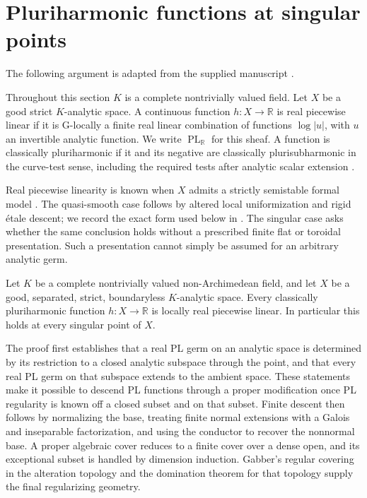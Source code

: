 \section{Pluriharmonic functions at singular points}
\label{sec:supplied-p061}

The following argument is adapted from the supplied manuscript
\cite{SuppliedP06120260924}.
\label{sec:supplied-p061-introduction}

Throughout this section $K$ is a complete nontrivially valued field.
Let $X$ be a good strict $K$-analytic space. A continuous function $h:X\to\mathbb R$ is real piecewise linear if it is G-locally a finite real linear combination of functions $\log|u|$, with $u$ an invertible analytic function. We write $\operatorname{PL}_{\mathbb R}$ for this sheaf. A function is classically pluriharmonic if it and its negative are classically plurisubharmonic in the curve-test sense, including the required tests after analytic scalar extension \cite[Definition~7.1]{GR25Classical}.

Real piecewise linearity is known when $X$ admits a strictly semistable formal model \cite[Proposition~7.8]{GR25Classical}. The quasi-smooth case follows by altered local uniformization and rigid \'{e}tale descent; we record the exact form used below in . The singular case asks whether the same conclusion holds without a prescribed finite flat or toroidal presentation. Such a presentation cannot simply be assumed for an arbitrary analytic germ.

\begin{theorem}\label{thm:supplied-p061-singular-pluriharmonic}
Let $K$ be a complete nontrivially valued non-Archimedean field, and let $X$ be a good, separated, strict, boundaryless $K$-analytic space. Every classically pluriharmonic function $h:X\to\mathbb R$ is locally real piecewise linear. In particular this holds at every singular point of $X$.
\end{theorem}

The proof first establishes that a real PL germ on an analytic space is determined by its restriction to a closed analytic subspace through the point, and that every real PL germ on that subspace extends to the ambient space. These statements make it possible to descend PL functions through a proper modification once PL regularity is known off a closed subset and on that subset. Finite descent then follows by normalizing the base, treating finite normal extensions with a Galois and inseparable factorization, and using the conductor to recover the nonnormal base. A proper algebraic cover reduces to a finite cover over a dense open, and its exceptional subset is handled by dimension induction. Gabber's regular covering in the alteration topology and the domination theorem for that topology \cite[Expos\'{e}~VII, Th\'{e}or\`{e}me~1.1; Expos\'{e}~II, Th\'{e}or\`{e}me~3.2.1]{ILO14} supply the final regularizing geometry.

